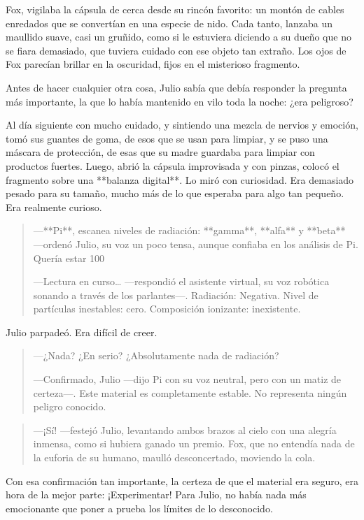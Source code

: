 \documentclass[a4paper,12pt]{book}
\begin{document}
Fox, vigilaba la cápsula de cerca desde su rincón favorito: un montón de cables enredados que se convertían en una especie de nido. Cada tanto, lanzaba un maullido suave, casi un gruñido, como si le estuviera diciendo a su dueño que no se fiara demasiado, que tuviera cuidado con ese objeto tan extraño. Los ojos de Fox parecían brillar en la oscuridad, fijos en el misterioso fragmento.

Antes de hacer cualquier otra cosa, Julio sabía que debía responder la pregunta más importante, la que lo había mantenido en vilo toda la noche: ¿era peligroso?

Al día siguiente con mucho cuidado, y sintiendo una mezcla de nervios y emoción, tomó sus guantes de goma, de esos que se usan para limpiar, y se puso una máscara de protección, de esas que su madre guardaba para limpiar con productos fuertes. Luego, abrió la cápsula improvisada y con pinzas, colocó el fragmento sobre una **balanza digital**. Lo miró con curiosidad. Era demasiado pesado para su tamaño, mucho más de lo que esperaba para algo tan pequeño. Era realmente curioso.

\begin{quote}
    —**Pi**, escanea niveles de radiación: **gamma**, **alfa** y **beta** —ordenó Julio, su voz un poco tensa, aunque confiaba en los análisis de Pi. Quería estar 100%

    —Lectura en curso… —respondió el asistente virtual, su voz robótica sonando a través de los parlantes—. Radiación: Negativa. Nivel de partículas inestables: cero. Composición ionizante: inexistente.
\end{quote}

Julio parpadeó. Era difícil de creer.

\begin{quote}
    —¿Nada? ¿En serio? ¿Absolutamente nada de radiación?

    —Confirmado, Julio —dijo Pi con su voz neutral, pero con un matiz de certeza—. Este material es completamente estable. No representa ningún peligro conocido.
\end{quote}

\begin{quote}
    —¡Sí! —festejó Julio, levantando ambos brazos al cielo con una alegría inmensa, como si hubiera ganado un premio. Fox, que no entendía nada de la euforia de su humano, maulló desconcertado, moviendo la cola.
\end{quote}

Con esa confirmación tan importante, la certeza de que el material era seguro, era hora de la mejor parte: ¡Experimentar! Para Julio, no había nada más emocionante que poner a prueba los límites de lo desconocido.
\end{document}
